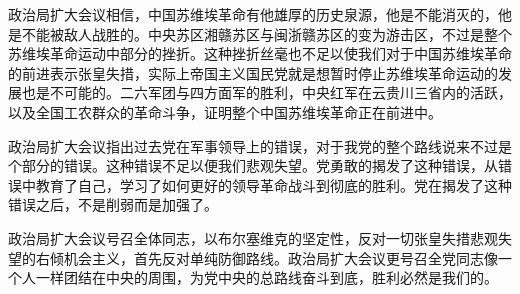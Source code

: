 政治局扩大会议相信，中国苏维埃革命有他雄厚的历史泉源，他是不能消灭的，他是不能被敌人战胜的。中央苏区湘赣苏区与闽浙赣苏区的变为游击区，不过是整个苏维埃革命运动中部分的挫折。这种挫折丝毫也不足以使我们对于中国苏维埃革命的前进表示张皇失措，实际上帝国主义国民党就是想暂时停止苏维埃革命运动的发展也是不可能的。二六军团与四方面军的胜利，中央红军在云贵川三省内的活跃，以及全国工农群众的革命斗争，证明整个中国苏维埃革命正在前进中。

政治局扩大会议指出过去党在军事领导上的错误，对于我党的整个路线说来不过是个部分的错误。这种错误不足以便我们悲观失望。党勇敢的揭发了这种错误，从错误中教育了自己，学习了如何更好的领导革命战斗到彻底的胜利。党在揭发了这种错误之后，不是削弱而是加强了。

政治局扩大会议号召全体同志，以布尔塞维克的坚定性，反对一切张皇失措悲观失望的右倾机会主义，首先反对单纯防御路线。政治局扩大会议更号召全党同志像一个人一样团结在中央的周围，为党中央的总路线奋斗到底，胜利必然是我们的。

